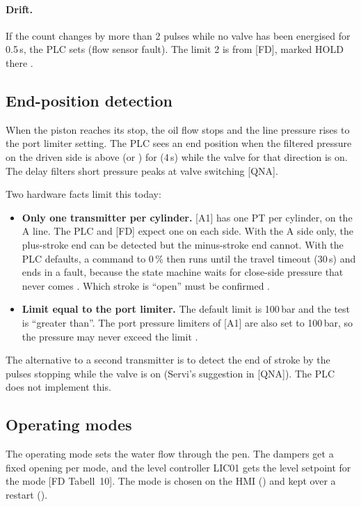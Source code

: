 \documentclass[11pt,a4paper]{article}
\begin{document}
\paragraph{Drift.} If the count changes by more than 2 pulses while no valve has been energised for
0.5\,s, the PLC sets  (flow sensor fault). The limit 2 is from [FD], marked HOLD
there .

\subsection{End-position detection}
When the piston reaches its stop, the oil flow stops and the line pressure rises to the port
limiter setting. The PLC sees an end position when the filtered pressure on the driven side is above
 (or ) for  (4\,s) while the
valve for that direction is on. The delay filters short pressure peaks at valve switching [QNA].

Two hardware facts limit this today:
\begin{itemize}[nosep]
  \item \textbf{Only one transmitter per cylinder.} [A1] has one PT per cylinder, on the A line.
        The PLC and [FD] expect one on each side. With the A side only, the plus-stroke end can be
        detected but the minus-stroke end cannot. With the PLC defaults, a command to 0\,\% then
        runs until the travel timeout (30\,s) and ends in a fault, because the state machine waits
        for close-side pressure that never comes . Which stroke is ``open'' must be
        confirmed .
  \item \textbf{Limit equal to the port limiter.} The default limit is 100\,bar and the test is
        ``greater than''. The port pressure limiters of [A1] are also set to 100\,bar, so the
        pressure may never exceed the limit .
\end{itemize}
The alternative to a second transmitter is to detect the end of stroke by the pulses stopping while
the valve is on (Servi's suggestion in [QNA]). The PLC does not implement this.

\subsection{Operating modes}
The operating mode sets the water flow through the pen. The dampers get a fixed opening per mode, and
the level controller LIC01 gets the level setpoint for the mode [FD Tabell~10]. The mode is chosen on
the HMI () and kept over a restart ().
\end{document}
